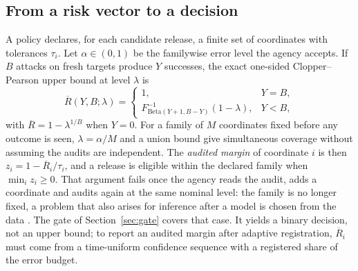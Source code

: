 \subsection{From a risk vector to a decision}\label{sec:decision}
A policy declares, for each candidate release, a finite set of coordinates with tolerances $\tau_i$. Let $\alpha\in(0,1)$ be the familywise error level the agency accepts. If $B$ attacks on fresh targets produce $Y$ successes, the exact one-sided Clopper--Pearson upper bound at level $\lambda$ is
\begin{equation}\label{eq:cp}
\overline{R}(Y,B;\lambda)=\begin{cases}1,&Y=B,\\F^{-1}_{\mathrm{Beta}(Y+1,B-Y)}(1-\lambda),&Y<B,\end{cases}
\end{equation}
with $\overline{R}=1-\lambda^{1/B}$ when $Y=0$. For a family of $M$ coordinates fixed before any outcome is seen, $\lambda=\alpha/M$ and a union bound \cite{dunn1961} give simultaneous coverage without assuming the audits are independent. The \emph{audited margin} of coordinate $i$ is then $z_i=1-\overline{R}_i/\tau_i$, and a release is eligible within the declared family when $\min_iz_i\ge0$. That argument fails once the agency reads the audit, adds a coordinate and audits again at the same nominal level: the family is no longer fixed, a problem that also arises for inference after a model is chosen from the data \cite{berk2013}. The gate of Section~\ref{sec:gate} covers that case. It yields a binary decision, not an upper bound; to report an audited margin after adaptive registration, $\overline{R}_i$ must come from a time-uniform confidence sequence \cite{howard2021,waudby2024} with a registered share of the error budget.
